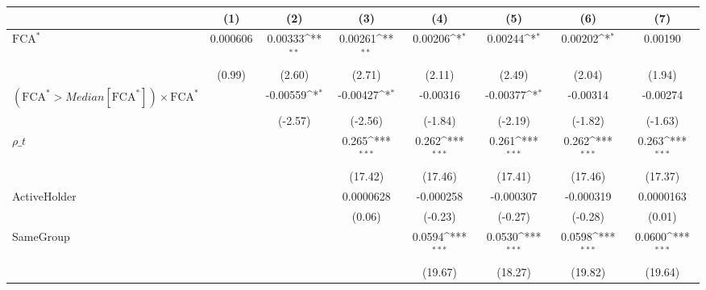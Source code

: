 {
\def\sym#1{\ifmmode^{#1}\else\(^{#1}\)\fi}
\begin{tabular}{l*{7}{c}}
\hline\hline
                    &\multicolumn{1}{c}{(1)}         &\multicolumn{1}{c}{(2)}         &\multicolumn{1}{c}{(3)}         &\multicolumn{1}{c}{(4)}         &\multicolumn{1}{c}{(5)}         &\multicolumn{1}{c}{(6)}         &\multicolumn{1}{c}{(7)}         \\
\hline
$ \text{FCA}^* $    &    0.000606         &     0.00333\sym{**} &     0.00261\sym{**} &     0.00206\sym{*}  &     0.00244\sym{*}  &     0.00202\sym{*}  &     0.00190         \\
                    &      (0.99)         &      (2.60)         &      (2.71)         &      (2.11)         &      (2.49)         &      (2.04)         &      (1.94)         \\
[1em]
 $ (\text{FCA}^* > Median[\text{FCA}^*]) \times {\text{FCA} ^*}  $ &                     &    -0.00559\sym{*}  &    -0.00427\sym{*}  &    -0.00316         &    -0.00377\sym{*}  &    -0.00314         &    -0.00274         \\
                    &                     &     (-2.57)         &     (-2.56)         &     (-1.84)         &     (-2.19)         &     (-1.82)         &     (-1.63)         \\
[1em]
$ \rho\_t $          &                     &                     &       0.265\sym{***}&       0.262\sym{***}&       0.261\sym{***}&       0.262\sym{***}&       0.263\sym{***}\\
                    &                     &                     &     (17.42)         &     (17.46)         &     (17.41)         &     (17.46)         &     (17.37)         \\
[1em]
ActiveHolder        &                     &                     &   0.0000628         &   -0.000258         &   -0.000307         &   -0.000319         &   0.0000163         \\
                    &                     &                     &      (0.06)         &     (-0.23)         &     (-0.27)         &     (-0.28)         &      (0.01)         \\
[1em]
SameGroup           &                     &                     &                     &      0.0594\sym{***}&      0.0530\sym{***}&      0.0598\sym{***}&      0.0600\sym{***}\\
                    &                     &                     &                     &     (19.67)         &     (18.27)         &     (19.82)         &     (19.64)         \\

\end{tabular}}
